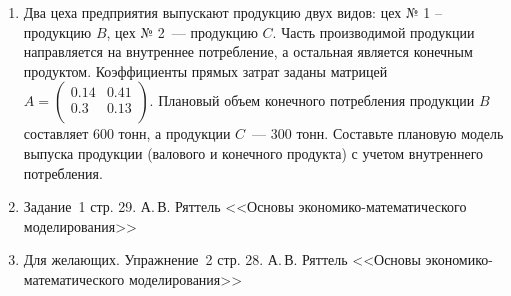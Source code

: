 \documentclass[a5paper,10pt]{extarticle}
\begin{document}
\begin{enumerate}
\item Два цеха предприятия выпускают продукцию двух видов: цех № 1 – продукцию $B$, цех № 2~--- продукцию $C$. Часть производимой продукции направляется на внутреннее потребление, а остальная является конечным продуктом. Коэффициенты прямых затрат заданы матрицей 
$A=\begin{pmatrix}
0.14 & 0.41\\
0.3 & 0.13\\
\end{pmatrix}
$.
Плановый объем конечного потребления продукции $B$ составляет  600 тонн, а продукции $C$~--- 300 тонн. 
Составьте плановую модель выпуска продукции (валового и конечного продукта) с учетом внутреннего потребления. 

\item Задание~1 стр. 29. А.\,В. Ряттель <<Основы экономико-математического моделирования>>
\item Для желающих. Упражнение~2 стр. 28. А.\,В. Ряттель <<Основы экономико-математического моделирования>>
\end{enumerate}
\end{document}
